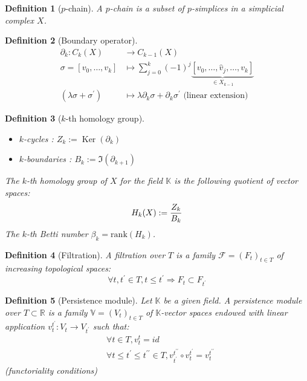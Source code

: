 \documentclass{article}
\DeclareMathOperator{\Ker}{Ker}
\newtheorem{definition}{Definition}
\newcommand{\K}{\mathbb{K}}
\newcommand{\F}{\mathcal{F}}
\begin{document}
\begin{definition}[$p$-chain]
  A $p$-chain is a subset of $p$-simplices in a simplicial complex $X$.
\end{definition}

\begin{definition}[Boundary operator]
  $$
  \begin{aligned}
  \partial_k: C_k(X) & \to C_{k-1}(X) \\
  \sigma=[v_0, \ldots, v_k] & \mapsto \sum_{j=0}^k(-1)^j \underbrace{[v_0,\ldots, \widehat{v}_j, \ldots, v_k]}_{\in X_{k-1}} \\
  \left(\lambda \sigma+\sigma^{\prime}\right) & \mapsto \lambda \partial_k \sigma+\partial_k \sigma^{\prime} \text{ (linear extension)}
  \end{aligned}
  $$
\end{definition}

\begin{definition}[$k$-th homology group]
  \begin{itemize}
    \item $k$-cycles : $Z_k:=\Ker(\partial_k)$
    \item $k$-boundaries : $B_k:=\Im(\partial_{k+1})$
  \end{itemize}
  The $k$-th homology group of $X$ for the field $\K$ is the following quotient
  of vector spaces:
  $$
  H_k(X):={Z_k\over B_k}
  $$
  The $k$-th Betti number $\beta_k = \mathrm{rank}(H_k)$.
\end{definition}

\begin{definition}[Filtration]
  A filtration over $T$ is a family $\F = (F_t)_{t\in T}$ of increasing topological spaces:
  $$
  \forall t, t^{\prime} \in T, t \leqslant t^{\prime} \Rightarrow F_t \subset F_{t^{\prime}}
  $$
\end{definition}

\begin{definition}[Persistence module]
  Let $\mathbb{K}$ be a given field. A persistence module over $T \subset \mathbb{R}$ is a family $\mathbb{V}=\left(V_t\right)_{t \in T}$ of $\mathbb{K}$-vector spaces endowed with linear application $v_t^{t^{\prime}}: V_t \rightarrow V_{t^{\prime}}$ such that:
  $$
  \begin{aligned}
  & \forall t \in T, v_t^t=i d \\
  & \forall t \leqslant t^{\prime} \leqslant t^{\prime \prime} \in T, v_{t^{\prime}}^{t^{\prime \prime}} \circ v_t^{t^{\prime}}=v_t^{t^{\prime \prime}}
  \end{aligned}
  $$
  (functoriality conditions)
\end{definition}
\end{document}
